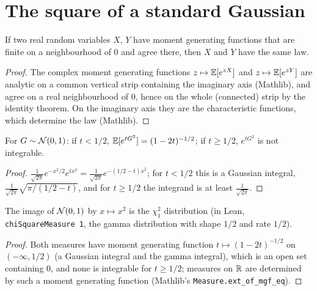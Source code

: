 \section{The square of a standard Gaussian}

\begin{lemma}
  \label{lem:mgf_ext}
  \leanok
  If two real random variables $X$, $Y$ have moment generating functions that are finite on a
  neighbourhood of $0$ and agree there, then $X$ and $Y$ have the same law.
\end{lemma}

\begin{proof}
  \leanok
  The complex moment generating functions $z \mapsto \mathbb{E}[e^{zX}]$ and $z \mapsto \mathbb{E}[e^{zY}]$ are
  analytic on a common vertical strip containing the imaginary axis (Mathlib), and agree on a real
  neighbourhood of $0$, hence on the whole (connected) strip by the identity theorem. On the
  imaginary axis they are the characteristic functions, which determine the law (Mathlib).
\end{proof}

\begin{lemma}
  \label{lem:gaussian_sq_mgf}
  \leanok
  For $G \sim \mathcal{N}(0, 1)$: if $t < 1/2$, $\mathbb{E}[e^{t G^2}] = (1 - 2t)^{-1/2}$; if $t \ge 1/2$,
  $e^{tG^2}$ is not integrable.
\end{lemma}

\begin{proof}
  \leanok
  $\frac{1}{\sqrt{2\pi}} e^{-x^2/2} e^{t x^2} = \frac{1}{\sqrt{2\pi}} e^{-(1/2 - t)x^2}$; for
  $t < 1/2$ this is a Gaussian integral, $\frac{1}{\sqrt{2\pi}} \sqrt{\pi / (1/2 - t)}$, and for
  $t \ge 1/2$ the integrand is at least $\frac{1}{\sqrt{2\pi}}$.
\end{proof}

\begin{lemma}
  \label{lem:gaussian_sq}
  \leanok
  The image of $\mathcal{N}(0, 1)$ by $x \mapsto x^2$ is the $\chi^2_1$ distribution (in Lean,
  \texttt{chiSquareMeasure 1}, the gamma distribution with shape $1/2$ and rate $1/2$).
\end{lemma}

\begin{proof}
  \leanok
  Both measures have moment generating function $t \mapsto (1 - 2t)^{-1/2}$ on $(-\infty, 1/2)$ (a
  Gaussian integral and the gamma integral), which is an open set containing $0$, and none is
  integrable for $t \ge 1/2$; measures on $\mathbb{R}$ are determined by such a moment generating function
  (Mathlib's \texttt{Measure.ext\_of\_mgf\_eq}).
\end{proof}
